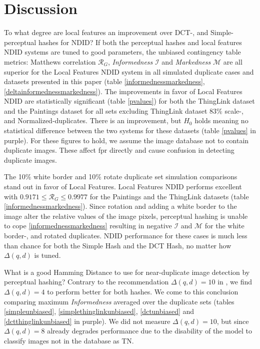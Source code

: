 \documentclass[english,12pt,a4paper,pdftex,elec,utf8, table]{aaltothesis}
\begin{document}
\section{Discussion}
To what degree are local features an improvement over DCT-, and Simple- perceptual hashes for NDID? If both the perceptual hashes and local features NDID systems are tuned to good parameters, the unbiased contingency table metrics: Matthews correlation $\mathcal{R}_G$, \emph{Informedness} $\mathcal{I}$ and \emph{Markedness} $\mathcal{M}$ are all superior for the Local Features NDID system in all simulated duplicate cases and datasets presented in this paper (table \ref{informednessmarkedness}, \ref{deltainformednessmarkedness}). The improvements in favor of Local Features NDID are statistically significant (table \ref{pvalues}) for both the ThingLink dataset and the Paintings dataset for all sets excluding ThingLink dataset 83\% scale-, and Normalized-duplicates. There is an improvement, but $H_0$ holds meaning no statistical difference between the two systems for these datasets (table \ref{pvalues} in purple). For these figures to hold, we assume the image database not to contain duplicate images. These affect fpr directly and cause confusion in detecting duplicate images.

The 10\% white border and 10\% rotate duplicate set simulation comparisons stand out in favor of Local Features. Local Features NDID performs excellent with $0.9171 \leq \mathcal{R}_G \leq 0.9977$ for the Paintings and the ThingLink datasets (table \ref{informednessmarkedness}). Since rotation and adding a white border to the image alter the relative values of the image pixels, perceptual hashing is unable to cope \ref{informednessmarkedness} resulting in negative $\mathcal{I}$ and $\mathcal{M}$ for the white border-, and rotated duplicates. NDID performance for these cases is much less than chance for both the Simple Hash and the DCT Hash, no matter how $\Delta(q,d)$ is tuned.

What is a good Hamming Distance to use for near-duplicate image detection by perceptual hashing? Contrary to the recommendation $\Delta(q,d)=10$ in \cite{Zauner2010}, we find $\Delta(q,d)=4$ to perform better for both hashes. We come to this conclusion comparing maximum \emph{Informedness} averaged over the duplicate sets (tables \ref{simpleunbiased}, \ref{simplethinglinkunbiased}, \ref{dctunbiased} and \ref{dctthinglinkunbiased} in purple). We did not measure $\Delta(q,d)=10$, but since $\Delta(q,d)=8$ already degrades performance due to the disability of the model to classify images not in the database as TN.
\end{document}
